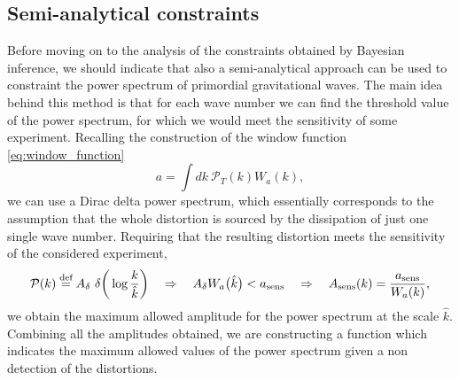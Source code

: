 \subsection{Semi-analytical constraints}
Before moving on to the analysis of the constraints obtained by Bayesian inference, we should indicate that also a semi-analytical approach can be used to constraint the power spectrum of primordial gravitational waves. The main idea behind this method is that for each wave number we can find the threshold value of the power spectrum, for which we would meet the sensitivity of some experiment. Recalling the construction of the window function \eqref{eq:window_function}
$$a=\int dk\ \mathcal P_T(k) W_a(k),$$
we can use a Dirac delta power spectrum, which essentially corresponds to the assumption that the whole distortion is sourced by the dissipation of just one single wave number. Requiring that the resulting distortion meets the sensitivity of the considered experiment,
$$\mathcal P(k)\defeq A_\delta\ \delta\bigg(\log\frac{k}{\hat k}\bigg)\quad \Rightarrow\quad A_\delta W_a\big(\hat k\big)<a_{\text{sens}}\quad \Rightarrow\quad A_{\text{sens}}(k)=\frac{a_{\text{sens}}}{W_a(k)},$$
we obtain the maximum allowed amplitude for the power spectrum at the scale $\hat k$. Combining all the amplitudes obtained, we are constructing a function which indicates the maximum allowed values of the power spectrum given a non detection of the distortions. 


